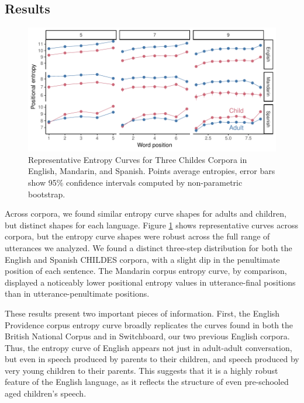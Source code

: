 \documentclass[10pt, letterpaper]{article}
\newenvironment{CodeChunk}{}{}
\begin{document}
\hypertarget{results-1}{%
\subsection{Results}\label{results-1}}

\begin{CodeChunk}
\begin{figure}[tb]

{\centering \includegraphics{figs/plot_childes-1} 

}

\caption[Representative Entropy Curves for Three Childes Corpora in English, Mandarin, and Spanish]{Representative Entropy Curves for Three Childes Corpora in English, Mandarin, and Spanish. Points average entropies, error bars show 95\% confidence intervals computed by non-parametric bootstrap.}\label{fig:plot_childes}
\end{figure}
\end{CodeChunk}

Across corpora, we found similar entropy curve shapes for adults and
children, but distinct shapes for each language. Figure
\ref{fig:plot_childes} shows representative curves across corpora, but
the entropy curve shapes were robust across the full range of utterances
we analyzed. We found a distinct three-step distribution for both the
English and Spanish CHILDES corpora, with a slight dip in the
penultimate position of each sentence. The Mandarin corpus entropy
curve, by comparison, displayed a noticeably lower positional entropy
values in utterance-final positions than in utterance-penultimate
positions.

These results present two important pieces of information. First, the
English Providence corpus entropy curve broadly replicates the curves
found in both the British National Corpus and in Switchboard, our two
previous English corpora. Thus, the entropy curve of English appears not
just in adult-adult conversation, but even in speech produced by parents
to their children, and speech produced by very young children to their
parents. This suggests that it is a highly robust feature of the English
language, as it reflects the structure of even pre-schooled aged
children's speech.
\end{document}
